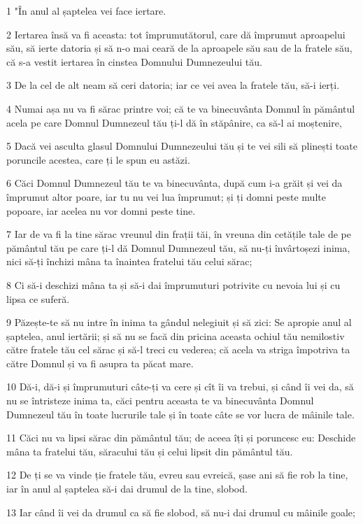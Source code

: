 \par 1 "În anul al șaptelea vei face iertare.
\par 2 Iertarea însă va fi aceasta: tot împrumutătorul, care dă împrumut aproapelui său, să ierte datoria și să n-o mai ceară de la aproapele său sau de la fratele său, că s-a vestit iertarea în cinstea Domnului Dumnezeului tău.
\par 3 De la cel de alt neam să ceri datoria; iar ce vei avea la fratele tău, să-i ierți.
\par 4 Numai așa nu va fi sărac printre voi; că te va binecuvânta Domnul în pământul acela pe care Domnul Dumnezeul tău ți-l dă în stăpânire, ca să-l ai moștenire,
\par 5 Dacă vei asculta glasul Domnului Dumnezeului tău și te vei sili să plinești toate poruncile acestea, care ți le spun eu astăzi.
\par 6 Căci Domnul Dumnezeul tău te va binecuvânta, după cum i-a grăit și vei da împrumut altor poare, iar tu nu vei lua împrumut; și ți domni peste multe popoare, iar acelea nu vor domni peste tine.
\par 7 Iar de va fi la tine sărac vreunul din frații tăi, în vreuna din cetățile tale de pe pământul tău pe care ți-l dă Domnul Dumnezeul tău, să nu-ți învârtoșezi inima, nici să-ți închizi mâna ta înaintea fratelui tău celui sărac;
\par 8 Ci să-i deschizi mâna ta și să-i dai împrumuturi potrivite cu nevoia lui și cu lipsa ce suferă.
\par 9 Păzește-te să nu intre în inima ta gândul nelegiuit și să zici: Se apropie anul al șaptelea, anul iertării; și să nu se facă din pricina aceasta ochiul tău nemilostiv către fratele tău cel sărac și să-l treci cu vederea; că acela va striga împotriva ta către Domnul și va fi asupra ta păcat mare.
\par 10 Dă-i, dă-i și împrumuturi câte-ți va cere și cît îi va trebui, și când îi vei da, să nu se întristeze inima ta, căci pentru aceasta te va binecuvânta Domnul Dumnezeul tău în toate lucrurile tale și în toate câte se vor lucra de mâinile tale.
\par 11 Căci nu va lipsi sărac din pământul tău; de aceea îți și poruncesc eu: Deschide mâna ta fratelui tău, săracului tău și celui lipsit din pământul tău.
\par 12 De ți se va vinde ție fratele tău, evreu sau evreică, șase ani să fie rob la tine, iar în anul al șaptelea să-i dai drumul de la tine, slobod.
\par 13 Iar când îi vei da drumul ca să fie slobod, să nu-i dai drumul cu mâinile goale;
